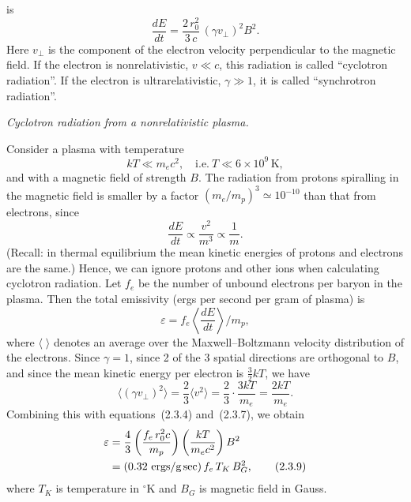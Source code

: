 


\noindent
is
\begin{equation}
\frac{dE}{dt} = \frac{2\,r_0^2}{3\,c}\,(\gamma v_\perp)^2 B^2.
\tag{2.3.4}
\end{equation}
Here $v_\perp$ is the component of the electron velocity perpendicular to the magnetic
field.  If the electron is nonrelativistic, $v \ll c$, this radiation is called ``cyclotron
radiation''.  If the electron is ultrarelativistic, $\gamma \gg 1$, it is called ``synchrotron
radiation''.

\medskip
\noindent
\textit{Cyclotron radiation from a nonrelativistic plasma.}

\medskip
\noindent
Consider a plasma with temperature
\begin{equation}
kT \ll m_e c^2, \quad \text{i.e.}\ T \ll 6 \times 10^9\,\text{K},
\tag{2.3.5}
\end{equation}
and with a magnetic field of strength $B$. The radiation from protons spiralling
in the magnetic field is smaller by a factor $(m_e/m_p)^3 \simeq 10^{-10}$ than that from
electrons, since
\begin{equation}
\frac{dE}{dt} \propto \frac{v^2}{m^3} \propto \frac{1}{m}.
\tag{2.3.6}
\end{equation}
(Recall: in thermal equilibrium the mean kinetic energies of protons and electrons
are the same.)  Hence, we can ignore protons and other ions when calculating
cyclotron radiation.  Let $f_e$ be the number of unbound electrons per baryon in
the plasma.  Then the total emissivity (ergs per second per gram of plasma) is
\begin{equation}
\varepsilon = f_e \left\langle \frac{dE}{dt} \right\rangle \bigg/ m_p,
\tag{2.3.7}
\end{equation}
where $\langle\;\rangle$ denotes an average over the Maxwell--Boltzmann velocity distribution
of the electrons.  Since $\gamma = 1$, since 2 of the 3 spatial directions are orthogonal
to $B$, and since the mean kinetic energy per electron is $\frac{3}{2}kT$, we have
\begin{equation}
\langle (\gamma v_\perp)^2 \rangle = \frac{2}{3}\langle v^2 \rangle = \frac{2}{3}\cdot\frac{3kT}{m_e} = \frac{2kT}{m_e}.
\tag{2.3.8}
\end{equation}
Combining this with equations~(2.3.4) and~(2.3.7), we obtain
\begin{align}
\varepsilon &= \frac{4}{3}\left(\frac{f_e\,r_0^2 c}{m_p}\right)
\left(\frac{kT}{m_e c^2}\right)B^2 \notag \\
&= (0.32~\text{ergs/g\,sec})\,f_e\,T_K\,B_G^2,
\tag{2.3.9}
\end{align}
where $T_K$ is temperature in ${}^\circ$K and $B_G$ is magnetic field in Gauss.

